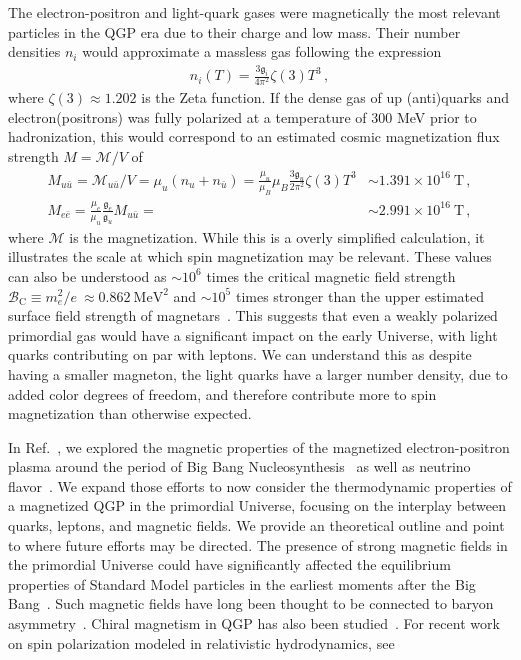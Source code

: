 \documentclass[epjST]{svjour}
\begin{document}
The electron-positron and light-quark gases were magnetically the most relevant particles in the QGP era due to their charge and low mass. Their number densities \(n_{i}\) would approximate a massless gas following the expression
\begin{align}
    n_{i}(T) = \frac{3\mathfrak{g}_{i}}{4\pi^{2}}\zeta(3)T^{3}\,,
\end{align}
where \(\zeta(3)\approx1.202\) is the Zeta function. If the dense gas of up (anti)quarks and electron(positrons) was fully polarized at a temperature of \(300\) MeV prior to hadronization, this would correspond to an estimated cosmic magnetization flux strength \(M = \mathcal{M}/V\) of
\begin{align}
    M_{u\bar{u}} = \mathcal{M}_{u\bar{u}}/V = \mu_{u}(n_{u}+n_{\bar{u}}) = \frac{\mu_{u}}{\mu_{B}}\mu_{B}\frac{3\mathfrak{g}_{u}}{2\pi^{2}}\zeta(3)T^{3} & \sim 1.391\times10^{16}\ \mathrm{T}\,,\\
    M_{e\bar{e}} = \frac{\mu_{e}}{\mu_{u}} \frac{\mathfrak{g}_{e}}{\mathfrak{g}_{u}} M_{u\bar{u}} = & \sim 2.991\times10^{16}\ \mathrm{T}\,,
\end{align}
where \(\mathcal{M}\) is the magnetization. While this is a overly simplified calculation, it illustrates the scale at which spin magnetization may be relevant. These values can also be understood as \(\sim 10^{6}\) times the critical magnetic field strength \(\mathcal{B}_\mathrm{C}\equiv m_{e}^{2}/e\ \approx 0.862\ \mathrm{MeV}^{2}\) and \(\sim 10^5\) times stronger than the upper estimated surface field strength of magnetars~\cite{Kaspi:2017fwg}. This suggests that even a weakly polarized primordial gas would have a significant impact on the early Universe, with light quarks contributing on par with leptons. We can understand this as despite having a smaller magneton, the light quarks have a larger number density, due to added color degrees of freedom, and therefore contribute more to spin magnetization than otherwise expected.

In Ref.~\cite{Steinmetz:2023nsc,Steinmetz:2023ucp}, we explored the magnetic properties of the magnetized electron-positron plasma around the period of Big Bang Nucleosynthesis~\cite{Grayson:2023flr,Grayson:2024uwg} as well as neutrino flavor~\cite{Rafelski:2023zgp}. We expand those efforts to now consider the thermodynamic properties of a magnetized QGP in the primordial Universe, focusing on the interplay between quarks, leptons, and magnetic fields. We provide an theoretical outline and point to where future efforts may be directed. The presence of strong magnetic fields in the primordial Universe could have significantly affected the equilibrium properties of Standard Model particles in the earliest moments after the Big Bang~\cite{Durrer:2013pga,Subramanian:2015lua}. Such magnetic fields have long been thought to be connected to baryon asymmetry~\cite{Vachaspati:1991nm,Baym:1995fk}. Chiral magnetism in QGP has also been studied~\cite{Fukushima:2008xe,Boyarsky:2011uy,Bali:2011qj}. For recent work on spin polarization modeled in relativistic hydrodynamics, see~\cite{Florkowski:2024cif,Bhadury:2024whs,Becattini:2024uha,Singh:2024cub}
\end{document}
